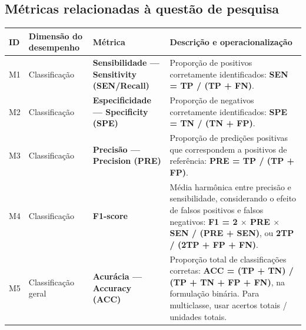 \subsection{Métricas relacionadas à questão de
pesquisa}\label{muxe9tricas-relacionadas-uxe0-questuxe3o-de-pesquisa}

{\def\LTcaptype{none} %
\begin{longtable}[]{@{}
  >{\raggedright\arraybackslash}p{}
  >{\raggedright\arraybackslash}p{}
  >{\raggedright\arraybackslash}p{}
  >{\raggedright\arraybackslash}p{}@{}}
\toprule\noalign{}
\begin{minipage}[b]{\linewidth}\raggedright
ID
\end{minipage} & \begin{minipage}[b]{\linewidth}\raggedright
Dimensão do desempenho
\end{minipage} & \begin{minipage}[b]{\linewidth}\raggedright
Métrica
\end{minipage} & \begin{minipage}[b]{\linewidth}\raggedright
Descrição e operacionalização
\end{minipage} \\
\midrule\noalign{}
\endhead
\bottomrule\noalign{}
\endlastfoot
M1 & Classificação & \textbf{Sensibilidade --- Sensitivity (SEN/Recall)}
& Proporção de positivos corretamente identificados: \textbf{SEN = TP /
(TP + FN)}. \\
M2 & Classificação & \textbf{Especificidade --- Specificity (SPE)} &
Proporção de negativos corretamente identificados: \textbf{SPE = TN /
(TN + FP)}. \\
M3 & Classificação & \textbf{Precisão --- Precision (PRE)} & Proporção
de predições positivas que correspondem a positivos de referência:
\textbf{PRE = TP / (TP + FP)}. \\
M4 & Classificação & \textbf{F1-score} & Média harmônica entre precisão
e sensibilidade, considerando o efeito de falsos positivos e falsos
negativos: \textbf{F1 = 2 $\times$ PRE $\times$ SEN / (PRE + SEN)}, ou \textbf{2TP /
(2TP + FP + FN)}. \\
M5 & Classificação geral & \textbf{Acurácia --- Accuracy (ACC)} &
Proporção total de classificações corretas: \textbf{ACC = (TP + TN) /
(TP + TN + FP + FN)}, na formulação binária. Para multiclasse, usar
acertos totais / unidades totais. \\

\end{longtable}}
